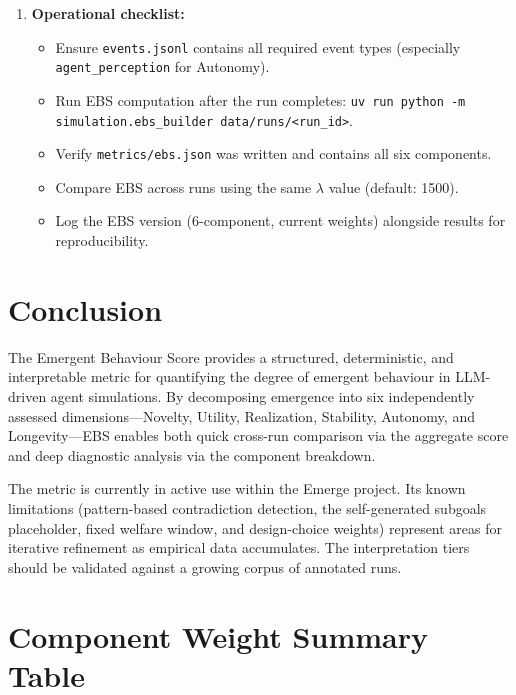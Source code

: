 \documentclass[a4paper, 11pt]{article}
\begin{document}
\begin{enumerate}
    \item \textbf{Operational checklist:}
    \begin{itemize}[nosep]
        \item Ensure \texttt{events.jsonl} contains all required event types (especially \texttt{agent\_perception} for Autonomy).
        \item Run EBS computation after the run completes: \texttt{uv run python -m simulation.ebs\_builder data/runs/<run\_id>}.
        \item Verify \texttt{metrics/ebs.json} was written and contains all six components.
        \item Compare EBS across runs using the same $\lambda$ value (default: 1500).
        \item Log the EBS version (6-component, current weights) alongside results for reproducibility.
    \end{itemize}
\end{enumerate}

\section{Conclusion}

The Emergent Behaviour Score provides a structured, deterministic, and interpretable metric for quantifying the degree of emergent behaviour in LLM-driven agent simulations. By decomposing emergence into six independently assessed dimensions---Novelty, Utility, Realization, Stability, Autonomy, and Longevity---EBS enables both quick cross-run comparison via the aggregate score and deep diagnostic analysis via the component breakdown.

The metric is currently in active use within the Emerge project. Its known limitations (pattern-based contradiction detection, the self-generated subgoals placeholder, fixed welfare window, and design-choice weights) represent areas for iterative refinement as empirical data accumulates. The interpretation tiers should be validated against a growing corpus of annotated runs.

\appendix

\section{Component Weight Summary Table}
\label{app:weights}
\end{document}

